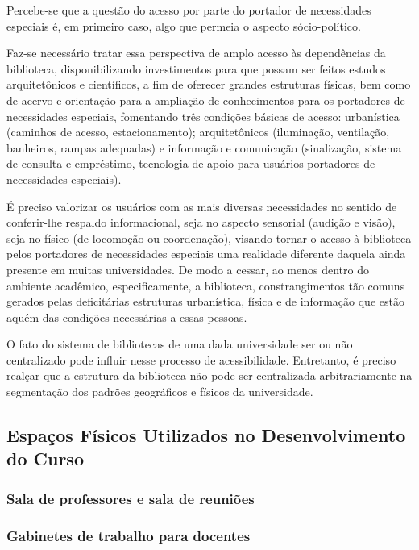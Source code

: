 	Percebe-se que a questão do acesso por parte do portador de necessidades especiais é, em primeiro caso, algo que permeia o aspecto sócio-político.

	Faz-se necessário tratar essa perspectiva de amplo acesso às dependências da biblioteca, disponibilizando investimentos para que possam ser feitos estudos arquitetônicos e científicos, a fim de oferecer grandes estruturas físicas, bem como de acervo e orientação para a ampliação de conhecimentos para os portadores de necessidades especiais, fomentando três condições básicas de acesso: urbanística (caminhos de acesso, estacionamento); arquitetônicos (iluminação, ventilação, banheiros, rampas adequadas) e informação e comunicação (sinalização, sistema de consulta e empréstimo, tecnologia de apoio para usuários portadores de necessidades especiais).
	
	É preciso valorizar os usuários com as mais diversas necessidades no sentido de conferir-lhe respaldo informacional, seja no aspecto sensorial (audição e visão), seja no físico (de locomoção ou coordenação), visando tornar o acesso à biblioteca pelos portadores de necessidades especiais uma realidade diferente daquela ainda presente em muitas universidades. De modo a cessar, ao menos dentro do ambiente acadêmico, especificamente, a biblioteca, constrangimentos tão comuns gerados pelas deficitárias estruturas urbanística, física e de informação que estão aquém das condições necessárias a essas pessoas.
	
	O fato do sistema de bibliotecas de uma dada universidade ser ou não centralizado pode influir nesse processo de acessibilidade. Entretanto, é preciso realçar que a estrutura da biblioteca não pode ser centralizada arbitrariamente na segmentação dos padrões geográficos e físicos da universidade.


\subsection{Espa\c{c}os F\'isicos Utilizados no Desenvolvimento do Curso}

\subsubsection{Sala de professores e sala de reuni\~oes}

\subsubsection{Gabinetes de trabalho para docentes}

